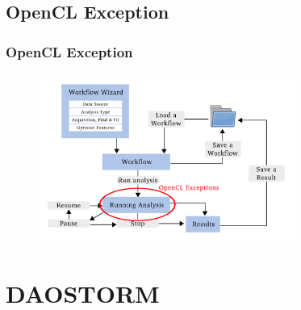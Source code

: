 \documentclass[aspectratio=169]{beamer}
\begin{document}
\subsection{OpenCL Exception}
\begin{frame}
\frametitle{OpenCL Exception}
\begin{figure}[h!]
    \centering	\includegraphics[width=0.75\textwidth]{./images/opencl_error.pdf} 
    \end{figure} 
 
\end{frame}



\section{DAOSTORM}
\end{document}

